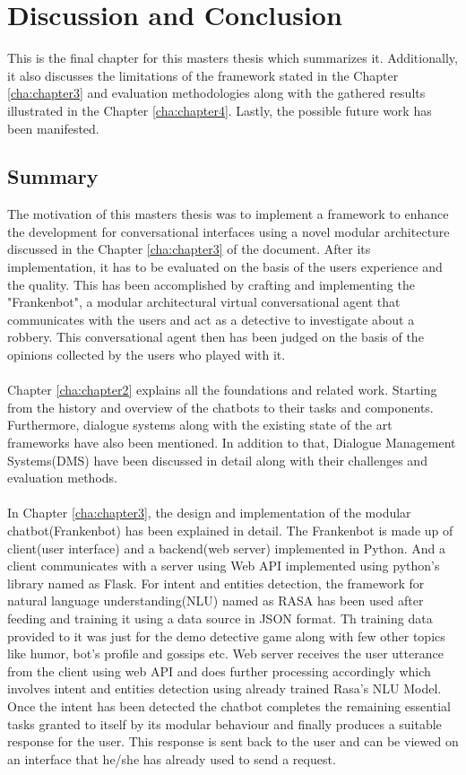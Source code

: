 \chapter{Discussion and Conclusion\label{cha:chapter5}}
This is the final chapter for this masters thesis which summarizes it. Additionally, it also discusses the limitations of the framework stated in the Chapter \ref{cha:chapter3} and evaluation methodologies along with the gathered results illustrated in the Chapter \ref{cha:chapter4}. Lastly, the possible future work has been manifested.

\section{Summary}
The motivation of this masters thesis was to implement a framework to enhance the development for conversational interfaces using a novel modular architecture discussed in the Chapter \ref{cha:chapter3} of the document. After its implementation, it has to be evaluated on the basis of the users experience and the quality. This has been accomplished by crafting and implementing the "Frankenbot", a modular architectural virtual conversational agent that communicates with the users and act as a detective to investigate about a robbery. This conversational agent then has been judged on the basis of the opinions collected by the users who played with it.
\\~\\
Chapter \ref{cha:chapter2} explains all the foundations and related work. Starting from the history and overview of the chatbots to their tasks and components. Furthermore, dialogue systems along with the existing state of the art frameworks have also been mentioned. In addition to that, Dialogue Management Systems(DMS) have been discussed in detail along with their challenges and evaluation methods.
\\~\\
In Chapter \ref{cha:chapter3}, the design and implementation of the modular chatbot(Frankenbot) has been explained in detail. The Frankenbot is made up of client(user interface) and a backend(web server) implemented in Python. And a client communicates with a server using Web API implemented using python's library named as Flask. For intent and entities detection, the framework for natural language understanding(NLU) named as RASA has been used after feeding and training it using a data source in JSON format. Th training data provided to it was just for the demo detective game along with few other topics like humor, bot's profile and gossips etc. Web server receives the user utterance from the client using web API and does further processing accordingly which involves intent and entities detection using already trained Rasa's NLU Model. Once the intent has been detected the chatbot completes the remaining essential tasks granted to itself by its modular behaviour and finally produces a suitable response for the user. This response is sent back to the user and can be viewed on an interface that he/she has already used to send a request.
